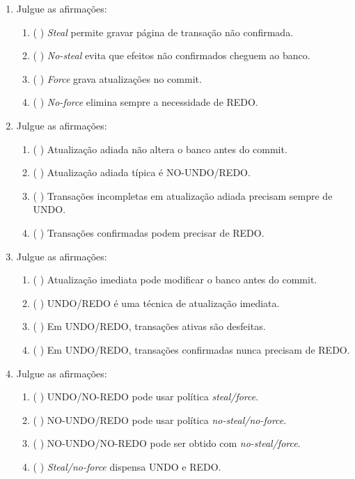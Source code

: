 \documentclass[12pt,a4paper]{article}
\begin{document}
\begin{enumerate}[resume,label=\textbf{Q\arabic*.}]
\item Julgue as afirmações:

\begin{enumerate}[label=\alph*)]
    \item ( \quad ) \textit{Steal} permite gravar página de transação não confirmada.
    \item ( \quad ) \textit{No-steal} evita que efeitos não confirmados cheguem ao banco.
    \item ( \quad ) \textit{Force} grava atualizações no commit.
    \item ( \quad ) \textit{No-force} elimina sempre a necessidade de REDO.
\end{enumerate}

\item Julgue as afirmações:

\begin{enumerate}[label=\alph*)]
    \item ( \quad ) Atualização adiada não altera o banco antes do commit.
    \item ( \quad ) Atualização adiada típica é NO-UNDO/REDO.
    \item ( \quad ) Transações incompletas em atualização adiada precisam sempre de UNDO.
    \item ( \quad ) Transações confirmadas podem precisar de REDO.
\end{enumerate}

\item Julgue as afirmações:

\begin{enumerate}[label=\alph*)]
    \item ( \quad ) Atualização imediata pode modificar o banco antes do commit.
    \item ( \quad ) UNDO/REDO é uma técnica de atualização imediata.
    \item ( \quad ) Em UNDO/REDO, transações ativas são desfeitas.
    \item ( \quad ) Em UNDO/REDO, transações confirmadas nunca precisam de REDO.
\end{enumerate}

\item Julgue as afirmações:

\begin{enumerate}[label=\alph*)]
    \item ( \quad ) UNDO/NO-REDO pode usar política \textit{steal/force}.
    \item ( \quad ) NO-UNDO/REDO pode usar política \textit{no-steal/no-force}.
    \item ( \quad ) NO-UNDO/NO-REDO pode ser obtido com \textit{no-steal/force}.
    \item ( \quad ) \textit{Steal/no-force} dispensa UNDO e REDO.
\end{enumerate}


\end{enumerate}
\end{document}
